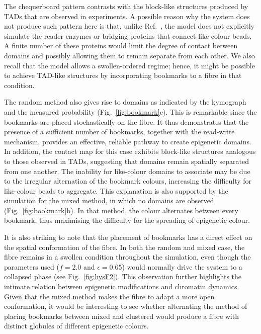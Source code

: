 \documentclass[12pt]{article}
\begin{document}
The chequerboard pattern contrasts with the block-like structures produced by TADs that are observed in experiments. A possible reason why the system does not produce such pattern here is that, unlike Ref.~\cite{brackley2016}, the model does not explicitly simulate the reader enzymes or bridging proteins that connect like-colour beads. A finite number of these proteins would limit the degree of contact between domains and possibly allowing them to remain separate from each other. We also recall that the model allows a swollen-ordered regime; hence, it might be possible to achieve TAD-like structures by incorporating bookmarks to a fibre in that condition. %

The random method also gives rise to domains as indicated by the kymograph and the measured probability (Fig.~\ref{fig:bookmark}c). This is remarkable since the bookmarks are placed stochastically on the fibre. It thus demonstrates that the presence of a sufficient number of bookmarks, together with the read-write mechanism, provides an effective, reliable pathway to create epigenetic domains. In addition, the contact map for this case exhibits block-like structures analogous to those observed in TADs, suggesting that domains remain spatially separated from one another. The inability for like-colour domains to associate may be due to the irregular alternation of the bookmark colours, increasing the difficulty for like-colour beads to aggregate. This explanation is also supported by the simulation for the mixed method, in which no domains are observed (Fig.~\ref{fig:bookmark}b). In that method, the colour alternates between every bookmark, thus maximising the difficulty for the spreading of epigenetic colour. 

It is also striking to note that the placement of bookmarks has a direct effect on the spatial conformation of the fibre. In both the random and mixed case, the fibre remains in a swollen condition throughout the simulation, even though the parameters used ($f = 2.0$ and $\epsilon = 0.65$) would normally drive the system to a collapsed phase (see Fig.~\ref{fig:hysF2}). This observation further highlights the intimate relation between epigenetic modifications and chromatin dynamics. Given that the mixed method makes the fibre to adapt a more open conformation, it would be interesting to see whether alternating the method of placing bookmarks between mixed and clustered would produce a fibre with distinct globules of different epigenetic colours.
\end{document}
